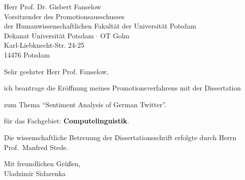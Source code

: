 \documentclass[12pt]{dinbrief}
\newcommand{\sgdh}{Sehr geehrter Herr Prof. Fanselow}
\newcommand{\wowa}{Uladzimir Sidarenka}
\begin{document}
\begin{letter}
  {
    Herr Prof. Dr. Gisbert Fanselow\\
    Vorsitzender des Promotionsausschusses\\
    der Humanwissenschaftlichen Fakult\"at der Universit\"at Potsdam\\
    Dekanat Universität Potsdam $\cdot$ OT Golm\\
    Karl-Liebknecht-Str. 24-25\\
    14476 Potsdam
  }

    \addresshigh
    \nowindowrules %
    \nobackaddressrule %

    \date{\today}
    \subject{\textbf{Antrag auf Er\"offnung meines Promotionsverfahrens}}
    \opening{\sgdh,}

    ich beantrage die Er\"offnung meines Promotionsverfahrens mit der
    Dissertation

    zum Thema ``Sentiment Analysis of German Twitter''.

    f\"ur das Fachgebiet: \textbf{Computelinguistik}.

    Die wissenschaftliche Betreuung der Dissertationsschrift erfolgte
    durch Herrn Prof.~Manfred Stede.

    \bigskip
    \closing{Mit freundlichen Gr\"u\ss{}en,\\ \wowa}
\end{letter}
\end{document}
